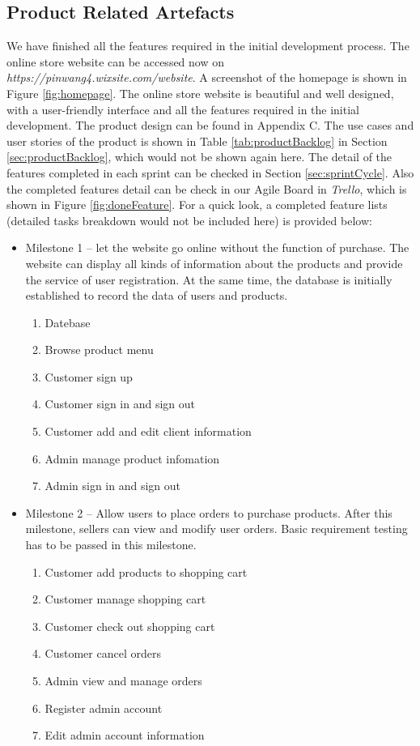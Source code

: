 \subsection{Product Related Artefacts}
We have finished all the features required in the initial development process. The online store website can be accessed now on \textit{https://pinwang4.wixsite.com/website}. A screenshot of the homepage is shown in Figure \ref{fig:homepage}. The online store website is beautiful and well designed, with a user-friendly interface and all the features required in the initial development. The product design can be found in Appendix C. The use cases and user stories of the product is shown in Table \ref{tab:productBacklog} in Section \ref{sec:productBacklog}, which would not be shown again here. The detail of the features completed in each sprint can be checked in Section \ref{sec:sprintCycle}. Also the completed features detail can be check in our Agile Board in \textit{Trello}, which is shown in Figure \ref{fig:doneFeature}. For a quick look, a completed feature lists (detailed tasks breakdown would not be included here) is provided below:
\\
\begin{itemize}
  \item Milestone 1 -- let the website go online without the function of purchase. The website can display all kinds of information about the products and provide the service of user registration. At the same time, the database is initially established to record the data of users and products.
  \begin{enumerate}
    \item Datebase
    \item Browse product menu
    \item Customer sign up
    \item Customer sign in and sign out
    \item Customer add and edit client information
    \item Admin manage product infomation
    \item Admin sign in and sign out
  \end{enumerate}
  \item Milestone 2 -- Allow users to place orders to purchase products. After this milestone, sellers can view and modify user orders. Basic requirement testing has to be passed in this milestone.
  \begin{enumerate}
    \item Customer add products to shopping cart
    \item Customer manage shopping cart
    \item Customer check out shopping cart
    \item Customer cancel orders
    \item Admin view and manage orders
    \item Register admin account
    \item Edit admin account information
  \end{enumerate}
\end{itemize}

